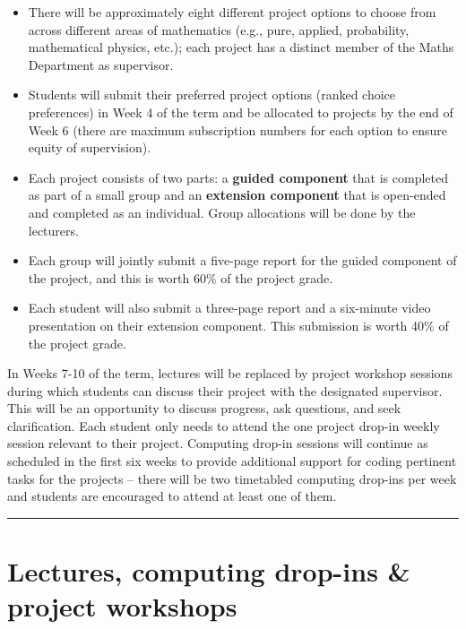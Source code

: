\documentclass[
  letterpaper,
  DIV=11,
  numbers=noendperiod]{scrreprt}
\providecommand{\tightlist}{%
  \setlength{\itemsep}{0pt}\setlength{\parskip}{0pt}}
\begin{document}
\begin{itemize}
\tightlist
\item
  There will be approximately eight different project options to choose
  from across different areas of mathematics (e.g., pure, applied,
  probability, mathematical physics, etc.); each project has a distinct
  member of the Maths Department as supervisor.
\item
  Students will submit their preferred project options (ranked choice
  preferences) in Week 4 of the term and be allocated to projects by the
  end of Week 6 (there are maximum subscription numbers for each option
  to ensure equity of supervision).
\item
  Each project consists of two parts: a \textbf{guided component} that
  is completed as part of a small group and an \textbf{extension
  component} that is open-ended and completed as an individual. Group
  allocations will be done by the lecturers.
\item
  Each group will jointly submit a five-page report for the guided
  component of the project, and this is worth 60\% of the project grade.
\item
  Each student will also submit a three-page report and a six-minute
  video presentation on their extension component. This submission is
  worth 40\% of the project grade.
\end{itemize}

In Weeks 7-10 of the term, lectures will be replaced by project workshop
sessions during which students can discuss their project with the
designated supervisor. This will be an opportunity to discuss progress,
ask questions, and seek clarification. Each student only needs to attend
the one project drop-in weekly session relevant to their project.
Computing drop-in sessions will continue as scheduled in the first six
weeks to provide additional support for coding pertinent tasks for the
projects -- there will be two timetabled computing drop-ins per week and
students are encouraged to attend at least one of them.

\begin{center}\rule{0.5\linewidth}{0.5pt}\end{center}

\section*{Lectures, computing drop-ins \& project
workshops}\label{lectures-computing-drop-ins-project-workshops}
\end{document}
